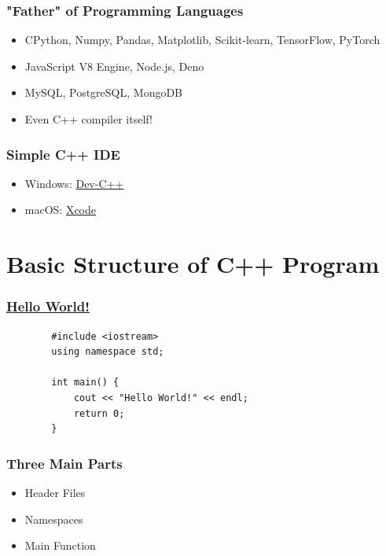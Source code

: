 \documentclass[xcolor=dvipsnames]{beamer}
\begin{document}
    \begin{frame}
        \frametitle{"Father" of Programming Languages}
        \begin{itemize}
            \item CPython, Numpy, Pandas, Matplotlib, Scikit-learn, TensorFlow, PyTorch
            \item JavaScript V8 Engine, Node.js, Deno
            \item MySQL, PostgreSQL, MongoDB
            \item Even C++ compiler itself!
        \end{itemize}
    \end{frame}

    \begin{frame}
        \frametitle{Simple C++ IDE}
        \begin{itemize}
            \item Windows: \href{https://sourceforge.net/projects/orwelldevcpp/}{Dev-C++}
            \item macOS: \href{https://developer.apple.com/xcode/}{Xcode}
        \end{itemize}
    \end{frame}

    \section{Basic Structure of C++ Program}

    \begin{frame}[fragile]
        \frametitle{\href{https://zh.wikipedia.org/zh-tw/Hello_Worldtext}{Hello World!}}
        \begin{verbatim}
        #include <iostream>
        using namespace std;

        int main() {
            cout << "Hello World!" << endl;
            return 0;
        }
        \end{verbatim}
    \end{frame}

    \begin{frame}
        \frametitle{Three Main Parts}
        \begin{itemize}
            \item Header Files
            \item Namespaces
            \item Main Function
        \end{itemize}
    \end{frame}
\end{document}
